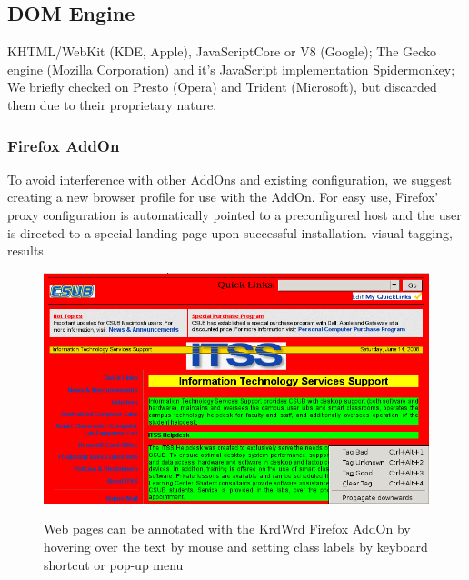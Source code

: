 \subsection{DOM Engine}

KHTML/WebKit (KDE, Apple), JavaScriptCore or V8 (Google);
The Gecko engine (Mozilla Corporation) and it's JavaScript implementation Spidermonkey;
We briefly checked on Presto (Opera) and Trident (Microsoft), but discarded them due to their proprietary nature.

\subsubsection{Firefox AddOn}

To avoid interference with other AddOns and existing configuration, we suggest creating a new browser profile for use with the AddOn.
For easy use, Firefox' proxy configuration is automatically pointed to a preconfigured host and the user is directed to a special landing page upon successful installation.
visual tagging, results

\begin{figure}
	{\includegraphics[width=\textwidth]{tut0}}
\caption{\label{f:tut0}Web pages can be annotated with the KrdWrd Firefox AddOn by hovering over the text by mouse and setting class labels by keyboard shortcut or pop-up menu}
\end{figure}


